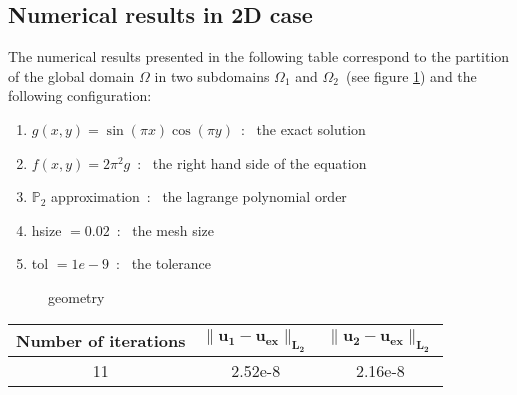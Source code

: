 \subsection{Numerical results in 2D case}
\label{sec:numerical-results-1}
The numerical results presented in the following table correspond to the partition of the global domain $\Omega$ in two subdomains $\Omega_1$ and $\Omega_2$~(see figure \ref{fig:original}) and the following configuration:
\begin{enumerate}
\item $ g(x,y) = \sin(\pi x)\cos(\pi y)$~:~ the exact solution
\item $f(x,y) = 2\pi^2g$~:~ the right hand side of the equation
\item $\mathbb P_2$ approximation~:~ the lagrange polynomial order
\item hsize $= 0.02$~:~ the mesh size
\item tol $=1e-9$~:~ the tolerance
\end{enumerate}

\begin{figure}[htbp]
  \centering
  \hspace{0.25cm}
  \caption{geometry}
  \label{fig:original}
\end{figure}

\vspace{0.3cm}
\begin{center}
  \begin{tabular}{|c|c|c|}
  \hline
   \textbf{Number of iterations} & $\mathbf {\| u_1-u_{ex}\|_{L_2} }$ & $\mathbf{\| u_2-u_{ex}\|_{L_2}}$ \\
   \hline
    11 & 2.52e-8 & 2.16e-8 \\
   \hline
 \end{tabular}
\end{center}
\vspace{0.2cm}
